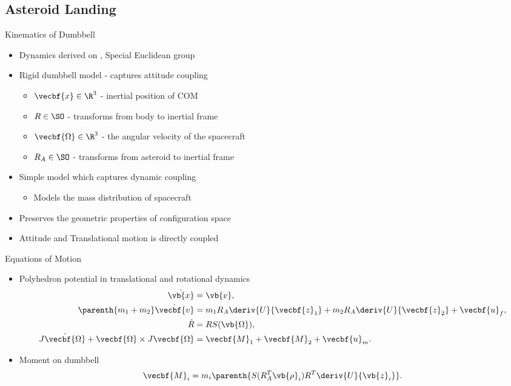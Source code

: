 
\subsection[Asteroid Landing]{Asteroid Landing}
\begin{frame}{Kinematics of Dumbbell}
    \begin{itemize}
        \item Dynamics derived on \SE, Special Euclidean group
        \item Rigid dumbbell model - captures attitude coupling
        \pause
        \begin{itemize}
            \item \( \vecbf{x} \in \R^3 \) - inertial position of COM
            \item \( R \in \SO\) - transforms from body to inertial frame
            \item \( \vecbf{\Omega} \in \R^3 \) - the angular velocity of the spacecraft 
            \item \( R_A \in \SO \) - transforms from asteroid to inertial frame
        \end{itemize}    
        \pause
    \item Simple model which captures dynamic coupling  
        \begin{itemize}
            \item Models the mass distribution of spacecraft 
        \end{itemize}
        \pause
    \item Preserves the geometric properties of configuration space
    \item Attitude and Translational motion is directly coupled
\end{itemize}

\end{frame}

\begin{frame}{Equations of Motion}

    \begin{itemize}
        \item Polyhedron potential in translational and rotational dynamics
        \begin{align*}
            \dot{\vb{x}} &= \vb{v}, \\
            \parenth{m_1 + m_2} \dot{\vecbf{v}} &= m_1 R_A \deriv{U}{\vecbf{z}_1} + m_2 R_A \deriv{U}{\vecbf{z}_2} + \vecbf{u}_f, \\
            \dot{R} &= R S(\vb{\Omega}) , \\
            J \dot{\vecbf{\Omega}} + \vecbf{\Omega} \times J \vecbf{\Omega} &= \vecbf{M}_1 + \vecbf{M}_2 + \vecbf{u}_m. 
        \end{align*}
    \item Moment on dumbbell
        \begin{align*}
            \vecbf{M}_i = m_i \parenth{S(R_A^T \vb{\rho}_i) R^T \deriv{U}{\vb{z}_i}}.
        \end{align*}
    \end{itemize}
\end{frame}

